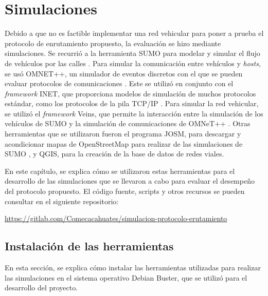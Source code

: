 ﻿\chapter{Simulaciones}
\label{ch:simulaciones}

Debido a que no es factible implementar una red vehicular para poner a prueba el
protocolo de enrutamiento propuesto, la evaluación se hizo mediante
simulaciones. Se recurrió a la herramienta SUMO para modelar y simular el flujo
de vehículos por las calles \cite{SUMO}. Para simular la comunicación entre
vehículos y \textit{hosts}, se usó OMNET++, un simulador de eventos discretos
con el que se pueden evaluar protocolos de comunicaciones \cite{OMNeT}. Este se
utilizó en conjunto con el \textit{framework} INET, que proporciona modelos de
simulación de muchos protocolos estándar, como los protocolos de la pila TCP/IP
\cite{INET}. Para simular la red vehicular, se utilizó el \textit{framework}
Veins, que permite la interacción entre la simulación de los vehículos de SUMO y
la simulación de comunicaciones de OMNeT++ \cite{Veins}. Otras herramientas que
se utilizaron fueron el programa JOSM, para descargar y acondicionar mapas de
OpenStreetMap para realizar de las simulaciones de SUMO \cite{OpenStreetMap}
\cite{JOSM}, y QGIS, para la creación de la base de datos de redes viales.

En este capítulo, se explica cómo se utilizaron estas herramientas para el
desarrollo de las simulaciones que se llevaron a cabo para evaluar el desempeño
del protocolo propuesto. El código fuente, scripts y otros recursos se  pueden
consultar en el siguiente repositorio:

\begin{center}
\href{https://gitlab.com/Comecacahuates/simulacion-protocolo-erutamiento}
{https://gitlab.com/Comecacahuates/simulacion-protocolo-erutamiento}
\end{center}

\section{Instalación de las herramientas}
\label{sec:instalacion_herramientas}

En esta sección, se explica cómo instalar las herramientas utilizadas para
realizar las simulaciones en el sistema operativo Debian Buster, que se utilizó
para el desarrollo del proyecto.

